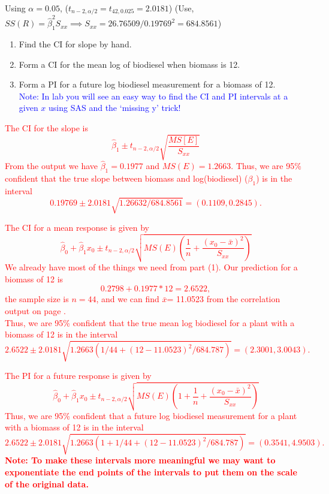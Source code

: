 Using $\alpha=0.05$, ($t_{n-2,\alpha/2}=t_{42,0.025}=2.0181$) (Use, $SS(R)=\hat{\beta}_1^2S_{xx}\implies S_{xx}=26.76509/0.19769^2=684.8561$)
\begin{enumerate}
\item Find the CI for slope by hand.
\item Form a CI for the mean log of biodiesel when biomass is 12.
\item Form a PI for a future log biodiesel measurement for a biomass of 12.\\
\textcolor{blue}{Note: In lab you will see an easy way to find the CI and PI intervals at a given $x$ using SAS and the `missing y' trick!}
\end{enumerate}

\begin{enumerate}
\item \textcolor{red}{The CI for the slope is 
$$\hat{\beta}_1 \pm t_{n-2,\alpha/2} \sqrt{\frac{MS[E]}{S_{xx}}}$$
From the output we have $\hat{\beta}_1=0.1977$ and $MS(E)=1.2663$.  
Thus, we are 95\% confident that the true slope between biomass and log(biodiesel) ($\beta_1$) is in the interval
$$0.19769 \pm 2.0181\sqrt{1.26632/684.8561}=(0.1109, 0.2845).$$
\item The CI for a mean response is given by 
$$\hat\beta_0 +\hat\beta_1 x_0 \pm t_{n-2,\alpha/2} \sqrt{MS(E)\left(\frac{1}{n}+\frac{(x_0-\bar{x})^2}{S_{xx}}\right)} $$  
We already have most of the things we need from part (1).  Our prediction for a biomass of 12 is 
$$0.2798+0.1977*12=2.6522,$$
the sample size is $n=44$, and we can find $\bar{x}$= 11.0523 from the correlation output on page \pageref{corrbio}.  \\
Thus, we are 95\% confident that the true mean log biodiesel for a plant with a biomass of 12 is in the interval
$$2.6522 \pm 2.0181\sqrt{1.2663(1/44+(12-11.0523)^2/684.787)}=(2.3001,3.0043).$$
\item The PI for a future response is given by 
$$\hat\beta_0 +\hat\beta_1 x_0 \pm t_{n-2,\alpha/2} \sqrt{MS(E)\left(1+\frac{1}{n}+\frac{(x_0-\bar{x})^2}{S_{xx}}\right)} $$
Thus, we are 95\% confident that a future log biodiesel measurement for a plant with a biomass of 12 is in the interval
$$2.6522 \pm 2.0181\sqrt{1.2663(1+1/44+(12-11.0523)^2/684.787)}=(0.3541,4.9503).$$
\textbf{Note: To make these intervals more meaningful we may want to exponentiate the end points of the intervals to put them on the scale of the original data.}}
\end{enumerate}

